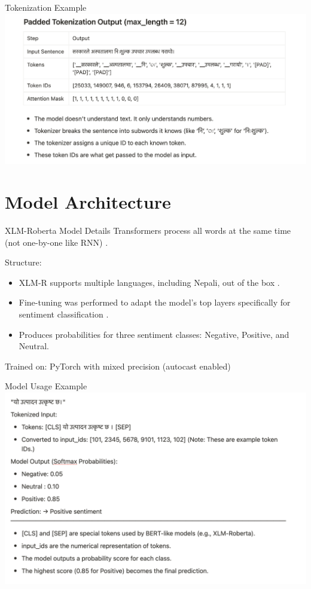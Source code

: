 \documentclass[aspectratio=169]{beamer}
\begin{document}
\begin{frame}{Tokenization Example}
  \centering
  \includegraphics[width=1\linewidth]{example.png}
\end{frame}

\section{Model Architecture}
\begin{frame}{XLM-Roberta Model Details}
  Transformers process all words at the same time (not one-by-one like RNN) \parencite{vaswani2023attentionneed}.

  Structure:
  \begin{itemize}
    \item XLM-R supports multiple languages, including Nepali, out of the box \parencite{conneau-etal-2020-unsupervised}.
    \item Fine-tuning was performed to adapt the model's top layers specifically for sentiment classification \parencite{devlin-etal-2019-bert,liu2019roberta}.
    \item Produces probabilities for three sentiment classes: Negative, Positive, and Neutral.
  \end{itemize}

  Trained on: PyTorch with mixed precision (autocast enabled) \parencite{paszke2019pytorchimperativestylehighperformance,priya2020mixed}
\end{frame}

\begin{frame}{Model Usage Example}
  \centering
  \includegraphics[width=0.85\linewidth]{example2.png}
\end{frame}
\end{document}
